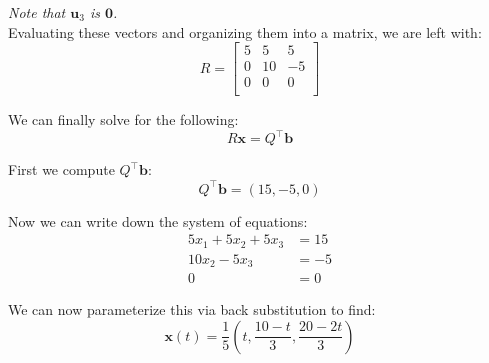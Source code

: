 \documentclass{article}
\newcommand{\mbf}[1]{\mathbf #1}
\begin{document}
\textit{Note that $\mbf u_3$ is $\mbf 0$.}\\

Evaluating these vectors and organizing them into a matrix, we are left with:
$$R=\begin{bmatrix}
    5 & 5 & 5\\
    0 & 10 & -5\\
    0 & 0 & 0\\
\end{bmatrix}$$

We can finally solve for the following:
$$R\mbf x=Q^\top\mbf b$$

First we compute $Q^\top\mbf b$:
$$Q^\top\mbf b=(15,-5,0)$$

Now we can write down the system of equations:
\begin{align*}
  5x_1+5x_2+5x_3&=15\\
  10x_2-5x_3&=-5\\
  0&=0
\end{align*}

We can now parameterize this via back substitution to find:
$$\mbf x(t)=\frac{1}{5}\left(t,\frac{10-t}{3},\frac{20-2t}{3}\right)$$
\end{document}
